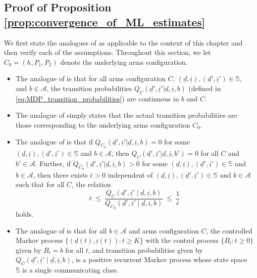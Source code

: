 \subsection{Proof of Proposition \ref{prop:convergence_of_ML_estimates}}
\label{appndx:proof_of_prop_convergence_of_ML_estimates_of_TPMs}
We first state the analogues of \cite[Assumptions A1-A5 and A6.1]{borkar1982identification} as applicable to the context of this chapter and then verify each of the assumptions. Throughout this section, we let $C_0=(h, P_1, P_2)$ denote the underlying arms configuration.
\begin{itemize}
	\item The analogue of \cite[Assumption A1]{borkar1982identification} is that for all arms configuration $C$, $(\underline{d}, \underline{i}), (\underline{d}', \underline{i}')\in \mathbb{S}$, and $b\in \mathcal{A}$, the transition probabilities $Q_C(\underline{d}', \underline{i}'|\underline{d}, \underline{i},b)$ (defined in \eqref{eq:MDP_transition_probabilities}) are continuous in $b$ and $C$.
	\item The analogue of \cite[Assumption A2]{borkar1982identification} simply states that the actual transition probabilities are those corresponding to the underlying arms configuration $C_0$.
	\item The analogue of \cite[Assumption A3]{borkar1982identification} is that if $Q_{C_0}(\underline{d}', \underline{i}'|\underline{d}, \underline{i},b)=0$ for some $(\underline{d}, \underline{i}), (\underline{d}', \underline{i}')\in \mathbb{S}$ and $b\in \mathcal{A}$, then $Q_{C}(\underline{d}', \underline{i}'|\underline{d}, \underline{i},b')=0$ for all $C$ and $b'\in \mathcal{A}$. Further, if $Q_{C_0}(\underline{d}', \underline{i}'|\underline{d}, \underline{i},b)>0$ for some $(\underline{d}, \underline{i}), (\underline{d}', \underline{i}')\in \mathbb{S}$ and $b\in \mathcal{A}$, then there exists $\bar{\epsilon}>0$ independent of $(\underline{d}, \underline{i}), (\underline{d}', \underline{i}')\in \mathbb{S}$ and $b\in \mathcal{A}$ such that for all $C$, the relation $$ \bar{\epsilon}~\leq~ \frac{Q_{C}(\underline{d}', \underline{i}' \mid \underline{d}, \underline{i}, b)}{Q_{C_0}(\underline{d}', \underline{i}' \mid \underline{d}, \underline{i}, b)} ~\leq~ \frac{1}{\bar{\epsilon}} $$ holds.
	\item The analogue of \cite[Assumption A4]{borkar1982identification} is that for all  $b\in \mathcal{A}$ and arms configuration $C$, the controlled Markov process $\{(\underline{d}(t), \underline{i}(t)): t\geq K\}$ with the control process $\{B_t:t\geq 0\}$ given by $B_t=b$ for all $t$, and transition probabilities given by $Q_C(\underline{d}', \underline{i}' \mid \underline{d}, \underline{i}, b)$, is a positive recurrent Markov process whose state space $\mathbb{S}$ is a single communicating class.

\end{itemize}
